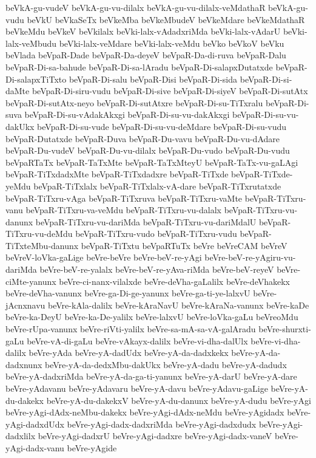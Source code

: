 {beVkA-gu-vudeV
beVkA-gu-vu-dilalx
beVkA-gu-vu-dilalx-veMdathaR
beVkA-gu-vudu
beVkU
beVkaSeTx
beVkeMba
beVkeMbudeV
beVkeMdare
beVkeMdathaR
beVkeMdu
beVkeV
beVkilalx
beVki-lalx-vAdadxriMda
beVki-lalx-vAdarU
beVki-lalx-veMbudu
beVki-lalx-veMdare
beVki-lalx-veMdu
beVko
beVkoV
beVku
beVlada
beVpaR-Dade
beVpaR-Da-deyeV
beVpaR-Da-di-ruva
beVpaR-Dalu
beVpaR-Di-sa-bahude
beVpaR-Di-sa-lAradu
beVpaR-Di-salapxDutatxde
beVpaR-Di-salapxTiTxto
beVpaR-Di-salu
beVpaR-Disi
beVpaR-Di-sida
beVpaR-Di-si-daMte
beVpaR-Di-siru-vudu
beVpaR-Di-sive
beVpaR-Di-siyeV
beVpaR-Di-sutAtx
beVpaR-Di-sutAtx-neyo
beVpaR-Di-sutAtxre
beVpaR-Di-su-TiTxralu
beVpaR-Di-suva
beVpaR-Di-su-vAdakAkxgi
beVpaR-Di-su-vu-dakAkxgi
beVpaR-Di-su-vu-dakUkx
beVpaR-Di-su-vude
beVpaR-Di-su-vu-deMdare
beVpaR-Di-su-vudu
beVpaR-Dutatxde
beVpaR-Duva
beVpaR-Du-vavu
beVpaR-Du-vu-dAdare
beVpaR-Du-vudeV
beVpaR-Du-vu-dilalx
beVpaR-Du-vudo
beVpaR-Du-vudu
beVpaRTaTx
beVpaR-TaTxMte
beVpaR-TaTxMteyU
beVpaR-TaTx-vu-gaLAgi
beVpaR-TiTxdadxMte
beVpaR-TiTxdadxre
beVpaR-TiTxde
beVpaR-TiTxde-yeMdu
beVpaR-TiTxlalx
beVpaR-TiTxlalx-vA-dare
beVpaR-TiTxrutatxde
beVpaR-TiTxru-vAga
beVpaR-TiTxruva
beVpaR-TiTxru-vaMte
beVpaR-TiTxru-vanu
beVpaR-TiTxru-va-veMdu
beVpaR-TiTxru-vu-dalalx
beVpaR-TiTxru-vu-danunx
beVpaR-TiTxru-vu-dariMda
beVpaR-TiTxru-vu-dariMdalU
beVpaR-TiTxru-vu-deMdu
beVpaR-TiTxru-vudo
beVpaR-TiTxru-vudu
beVpaR-TiTxteMbu-danunx
beVpaR-TiTxtu
beVpaRTuTx
beVre
beVreCAM
beVreV
beVreV-loVka-gaLige
beVre-beVre
beVre-beV-re-yAgi
beVre-beV-re-yAgiru-vu-dariMda
beVre-beV-re-yalalx
beVre-beV-re-yAva-riMda
beVre-beV-reyeV
beVre-ciMte-yanunx
beVre-ci-nanx-vilalxde
beVre-deVha-gaLalilx
beVre-deVhakekx
beVre-deVha-vanunx
beVre-ga-Di-ge-yanunx
beVre-ga-ti-ye-lalxvU
beVre-jAcnxnavu
beVre-kAla-dalilx
beVre-kAraNavU
beVre-kAraNa-vanunx
beVre-kaDe
beVre-ka-DeyU
beVre-ka-De-yalilx
beVre-lalxvU
beVre-loVka-gaLu
beVreoMdu
beVre-rUpa-vanunx
beVre-riVti-yalilx
beVre-sa-mA-sa-vA-galAradu
beVre-shurxti-gaLu
beVre-vA-di-gaLu
beVre-vAkayx-dalilx
beVre-vi-dha-dalUlx
beVre-vi-dha-dalilx
beVre-yAda
beVre-yA-dadUdx
beVre-yA-da-dadxkekx
beVre-yA-da-dadxnunx
beVre-yA-da-dedxMbu-dakUkx
beVre-yA-dadu
beVre-yA-dadudx
beVre-yA-dadxriMda
beVre-yA-da-ga-ti-yanunx
beVre-yA-darU
beVre-yA-dare
beVre-yAdavanu
beVre-yAdavaru
beVre-yA-davu
beVre-yAdavu-gaLige
beVre-yA-du-dakekx
beVre-yA-du-dakekxV
beVre-yA-du-danunx
beVre-yA-dudu
beVre-yAgi
beVre-yAgi-dAdx-neMbu-dakekx
beVre-yAgi-dAdx-neMdu
beVre-yAgidadx
beVre-yAgi-dadxdUdx
beVre-yAgi-dadx-dadxriMda
beVre-yAgi-dadxdudx
beVre-yAgi-dadxlilx
beVre-yAgi-dadxrU
beVre-yAgi-dadxre
beVre-yAgi-dadx-vaneV
beVre-yAgi-dadx-vanu
beVre-yAgide
}
